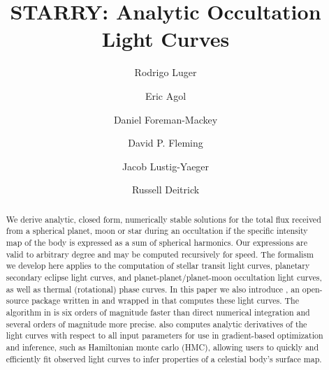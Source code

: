 \documentclass[modern]{aastex61}
\begin{document}

\setlength{\abovedisplayskip}{1.5em}
\setlength{\belowdisplayskip}{1.5em}

\title{%
    \textbf{STARRY}: Analytic Occultation Light Curves 
}

\author[0000-0002-0296-3826]{Rodrigo Luger}
%
\author{Eric Agol}
%
\author{Daniel Foreman-Mackey}
%
\author{David P. Fleming}
%
\author{Jacob Lustig-Yaeger}
%
\author{Russell Deitrick}


\begin{abstract}
We derive analytic, closed form, numerically stable solutions for the total flux
received from a spherical planet, moon or star during an occultation
if the specific intensity map of the body is expressed as a
sum of spherical harmonics. Our expressions are valid to arbitrary degree
and may be computed recursively for speed. The formalism we develop
here applies to the computation of stellar transit light curves,
planetary secondary eclipse light curves, and planet-planet/planet-moon
occultation light curves, as well as thermal (rotational) phase curves.
In this paper we also introduce \starry, an open-source package written in \cpp
and wrapped in \Python that computes these light curves.
The algorithm in \starry is six orders of magnitude faster than direct
numerical integration and several orders of magnitude more precise.
\starry also computes analytic derivatives of the light curves with respect to all input
parameters for use in gradient-based optimization and inference, such as
Hamiltonian monte carlo (HMC), allowing users to quickly and efficiently
fit observed light curves to infer properties of a celestial body's
surface map.
\end{abstract}
\end{document}
